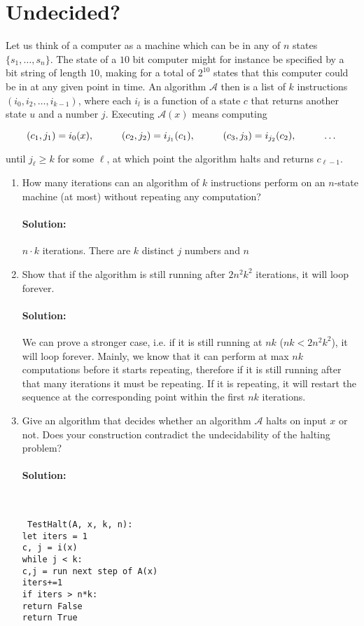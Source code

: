 \documentclass[11pt, notitlepage]{report}
\newcommand{\Question}[1]{\newpage\section{#1}}
\newenvironment{solution}{\paragraph{Solution:}}{\hfill}
\begin{document}
\Question{Undecided?}

Let us think of a computer as a machine which can be in any of $n$ states
$\{s_1, \dots, s_n\}$. The state of a $10$ bit computer might for instance be
specified by a bit string of length $10$, making for a total of $2^{10}$ states
that this computer could be in at any given point in time. An algorithm
$\mathcal A$ then is a list of $k$ instructions $(i_0, i_2, \dots, i_{k-1})$, where each 
$i_l$ is a function of a state $c$ that returns another state $u$ and a number $j$.
Executing $\mathcal A(x)$ means computing 

\[ (c_1,j_1) = i_0(x), \hspace{10mm} (c_2,j_2) = i_{j_1}(c_1), \hspace{10mm} (c_3, j_3) =
i_{j_2}(c_2), \hspace{10mm} \dots  \]

until $j_{\ell} \geq k$ for some $\ell$, at which point the algorithm halts and returns
$c_{\ell-1}$.

\begin{enumerate}[label=\alph*.)]
    \item How many iterations can an algorithm of $k$ instructions perform on an $n$-state 
    machine (at most) without repeating any computation?
    \begin{solution}
    	$n\cdot k$ iterations. There are $k$ distinct $j$ numbers and $n$    \end{solution}
    \item Show that if the algorithm is still running after $2n^2k^2$
    iterations, it will loop forever.
    \begin{solution}
    	We can prove a stronger case, i.e. if it is still running at $nk$ ($nk < 2n^2k^2$), it will loop forever. Mainly, we know that it can perform at max $nk$ computations before it starts repeating, therefore if it is still running after that many iterations it must be repeating. If it is repeating, it will restart the sequence at the corresponding point within the first $nk$ iterations.
    \end{solution}
    \item Give an algorithm that decides whether an algorithm $\mathcal A$ halts
    on input $x$ or not. Does your construction contradict the undecidability of
    the halting problem?
    \begin{solution} \
    
    	\texttt{
    	TestHalt(A, x, k, n): \\
    	\phantom{---} let iters = 1 \\
    	\phantom{---} c, j = i(x) \\
    	\phantom{---} while j < k: \\
    	\phantom{---}\phantom{---} c,j = run next step of A(x) \\
    	\phantom{---}\phantom{---} iters+=1 \\
    	\phantom{---}\phantom{---} if iters > n*k: \\
    	\phantom{---}\phantom{---} \phantom{---} return False \\
    	\phantom{---} return True
    	}
    \end{solution}
\end{enumerate}
\end{document}
